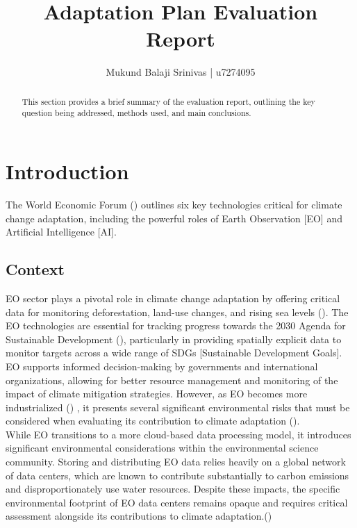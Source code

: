 \documentclass[12pt]{article}
\title{Adaptation Plan Evaluation Report}
\author{Mukund Balaji Srinivas | u7274095}
\date{} %
\begin{document}
\maketitle

\begin{abstract}
This section provides a brief summary of the evaluation report, outlining the key question being addressed, methods used, and main conclusions.
\end{abstract}

\newpage

\section*{Introduction}

The World Economic Forum (\cite{masterson_2024})  outlines six key technologies critical for climate change adaptation, 
including the powerful roles of Earth Observation [EO] and Artificial Intelligence [AI]. 


\subsection*{Context}
EO sector plays a pivotal role in climate change adaptation by offering critical data for monitoring deforestation, land-use changes, and rising sea levels (\cite{anderson_2017}). 
The EO technologies are essential for tracking progress towards the 2030 Agenda for Sustainable Development (\cite{unitednations_2015}), particularly in providing spatially explicit data to monitor targets across 
a wide range of SDGs [Sustainable Development Goals]. EO supports informed decision-making by governments and international 
organizations, allowing for better resource management and monitoring of the impact of climate mitigation strategies.
However, as EO becomes more industrialized (\cite{venkatesan_2020}) , it presents several significant environmental risks  
that must be considered when evaluating its contribution to climate adaptation (\cite{crisp_2020}). \\
While EO transitions to a more cloud-based data processing model, it introduces significant environmental 
considerations within the environmental science community. Storing and distributing EO data relies heavily on a global network of data centers, 
which are known to contribute substantially to carbon emissions and disproportionately use water resources. Despite these impacts, the specific 
environmental footprint of EO data centers remains opaque and requires critical assessment alongside its contributions to climate adaptation.(\cite{wilkinson_2024})
\end{document}
